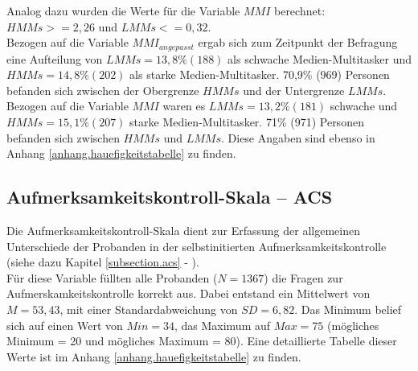 Analog dazu wurden die Werte für die Variable $MMI$ berechnet: $HMMs >= 2,26$ und $LMMs <= 0,32$. \\
Bezogen auf die Variable $MMI_{angepasst}$ ergab sich zum Zeitpunkt der Befragung eine Aufteilung von $LMMs = 13,8\% (188)$ als schwache Medien-Multitasker und $HMMs = 14,8\% (202)$ als starke Medien-Multitasker. 70,9\% (969) Personen befanden sich zwischen der Obergrenze $HMMs$ und der Untergrenze $LMMs$.
Bezogen auf die Variable $MMI$ waren es $LMMs = 13,2\% (181)$ schwache und $HMMs = 15,1\% (207)$ starke Medien-Multitasker. 71\% (971) Personen befanden sich zwischen $HMMs$ und $LMMs$. Diese Angaben sind ebenso in Anhang \ref{anhang.hauefigkeitstabelle} zu finden.

\subsection{Aufmerksamkeitskontroll-Skala -- ACS}
Die Aufmerksamkeitskontroll-Skala dient zur Erfassung der allgemeinen Unterschiede der Probanden in der selbstinitierten Aufmerksamkeitskontrolle (siehe dazu Kapitel \ref{subsection.acs} - ). \\ Für diese Variable füllten alle Probanden ($N=1367$) die Fragen zur Aufmerskamkeitskontrolle korrekt aus. Dabei entstand ein Mittelwert von $M = 53,43$, mit einer Standardabweichung von $SD = 6,82$. Das Minimum belief sich auf einen Wert von $Min = 34$, das Maximum auf $Max = 75$ (mögliches Minimum = 20 und mögliches Maximum = 80). Eine detaillierte Tabelle dieser Werte ist im Anhang \ref{anhang.hauefigkeitstabelle} zu finden.
